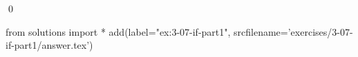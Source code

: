 
\begin{ex}
  \label{ex:3-07-if-part1}
  
  \qed
\end{ex}
\begin{python0}
from solutions import *
add(label="ex:3-07-if-part1",
    srcfilename='exercises/3-07-if-part1/answer.tex')
\end{python0}
